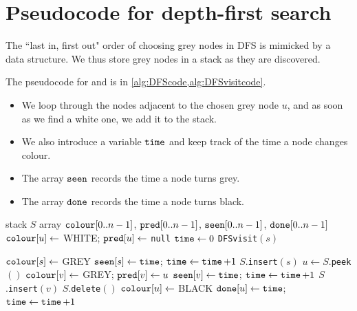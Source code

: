 \section{Pseudocode for depth-first search} \label{ss: DFS}
The ``last in, first out" order of choosing grey nodes in DFS is mimicked by a  data structure. 
We thus store grey nodes in a stack as they are discovered. 

The pseudocode for  and  is in \cref{alg:DFScode,alg:DFSvisitcode}. 
\begin{itemize}
  \item We loop through the nodes adjacent to the chosen grey node $u$, 
  and as soon as we find a white one, we add it to the stack.
  \item We also introduce a variable $\operatorname{\text{\texttt{time}}}$ and keep track of the time a node changes colour.
  \item The array $\operatorname{\text{\texttt{seen}}}$ records the time a node turns grey.
  \item The array  $\operatorname{\text{\texttt{done}}}$ records the time a node turns black.
\end{itemize}

\begin{algorithm}[H]
  \caption{Depth-first search algorithm.}
    \label{alg:DFScode}
\begin{algorithmic}[1]
	\State stack $S$ 
	\State array $\operatorname{\text{\texttt{colour}}}[0..n-1]$, $\operatorname{\text{\texttt{pred}}}[0..n-1]$, $\operatorname{\text{\texttt{seen}}}[0..n-1]$, $\operatorname{\text{\texttt{done}}}[0..n-1]$
		\State $\operatorname{\text{\texttt{colour}}}[u] \gets $ WHITE; $\operatorname{\text{\texttt{pred}}}[u] \gets $ \texttt{null} 
	\EndFor
	\State $\operatorname{\text{\texttt{time}}} \gets 0$ 
		  
			\State \texttt{DFSvisit}$(s)$ 
		\EndIf
	\EndFor
	\State \Return{$\pred, \seen, \done$}
\EndFunction
\end{algorithmic}
\end{algorithm}

\begin{algorithm}[H]
  \caption{Depth-first visit algorithm.}
    \label{alg:DFSvisitcode}
\begin{algorithmic}[1]
	\State $\operatorname{\text{\texttt{colour}}}[s] \gets $ GREY 
	\State $\operatorname{\text{\texttt{seen}}}[s] \gets \operatorname{\text{\texttt{time}}}$; $\operatorname{\text{\texttt{time}}} \gets \operatorname{\text{\texttt{time}}} + 1$
	\State $S$.\texttt{insert}$(s)$ 
		\State $u \gets S$.\texttt{peek}$()$  
			\State $\operatorname{\text{\texttt{colour}}}[v] \gets $ GREY; $\operatorname{\text{\texttt{pred}}}[v] \gets u$  
			\State $\operatorname{\text{\texttt{seen}}}[v] \gets \operatorname{\text{\texttt{time}}}$; $\operatorname{\text{\texttt{time}}} \gets \operatorname{\text{\texttt{time}}} + 1$  
			\State $S$.\texttt{insert}$(v)$  
		\Else
			\State $S$.\texttt{delete}$()$  
			\State $\operatorname{\text{\texttt{colour}}}[u] \gets $ BLACK  
			\State $\operatorname{\text{\texttt{done}}}[u] \gets \operatorname{\text{\texttt{time}}}$; $\operatorname{\text{\texttt{time}}} \gets \operatorname{\text{\texttt{time}}} + 1$  
		\EndIf
	\EndWhile
\EndFunction
\end{algorithmic}
\end{algorithm}

